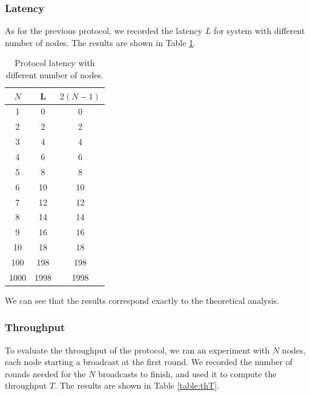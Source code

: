 \documentclass[a4paper]{article}
\begin{document}
\subsubsection{Latency}
As for the previous protocol, we recorded the latency $L$ for system with
different number of nodes. The results are shown in Table \ref{table:th}.

\begin{table}[H]
    \centering
    \begin{tabular}{|c|c|c|}
        \hline
        $N$   & L   & $2(N-1)$ \\
        \hline
        1     & 0   & 0    \\
        2     & 2   & 2   \\
        3     & 4   & 4   \\
        4     & 6   & 6   \\
        5     & 8   & 8   \\
        6     & 10  & 10  \\
        7     & 12  & 12  \\
        8     & 14  & 14  \\
        9     & 16  & 16  \\
        10    & 18  & 18  \\
        100   & 198 & 198  \\
        1000  & 1998   & 1998  \\
        \hline
    \end{tabular}
    \caption{Protocol latency with different number of nodes.}
    \label{table:th}
\end{table}

We can see that the results correspond exactly to the theoretical analysis.

\subsubsection{Throughput}
To evaluate the throughput of the protocol, we ran an experiment with $N$
nodes, each node starting a broadcast at the first round. We recorded the
number of rounds needed for the $N$ broadcasts to finish, and used it to
compute the throughput $T$. The results are shown in Table \ref{table:thT}.
\end{document}
